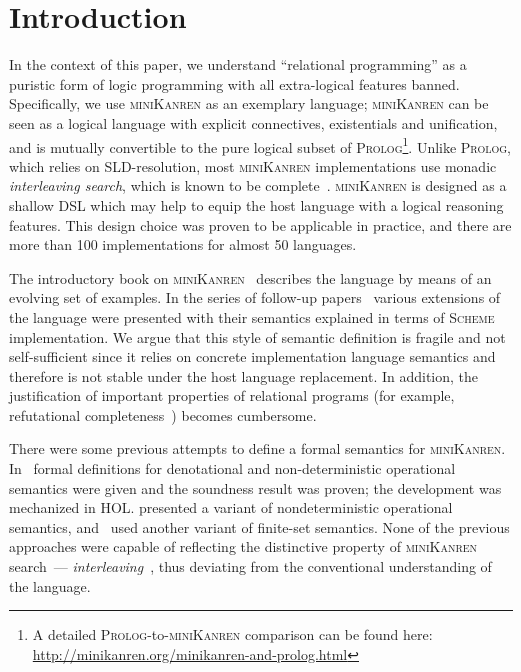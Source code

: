 \section{Introduction}

In the context of this paper, we understand ``relational programming'' as a puristic form of logic programming with all extra-logical
features banned. Specifically, we use \textsc{miniKanren} as an exemplary language; \textsc{miniKanren} can be seen as
a logical language with explicit connectives, existentials and unification, and is mutually convertible to the pure logical subset of
\textsc{Prolog}\footnote{A detailed \textsc{Prolog}-to-\textsc{miniKanren} comparison can be found here: \url{http://minikanren.org/minikanren-and-prolog.html}}.
Unlike \textsc{Prolog}, which relies on SLD-resolution, most \textsc{miniKanren} implementations use monadic \emph{interleaving
search}, which is known to be complete~\cite{2016}.
\textsc{miniKanren} is designed as a shallow DSL which may help to equip the host language with a logical reasoning features. This
design choice was proven to be applicable in practice, and there are more than 100 implementations for almost 50 languages.

The introductory book on \textsc{miniKanren}~\cite{TRS} describes the language by means of an evolving set of examples. In the
series of follow-up papers~\cite{MicroKanren,CKanren,CKanren1,AlphaKanren,2016,Guided} various extensions of the language were presented with
their semantics explained in terms of \textsc{Scheme} implementation. We argue that this style of semantic definition is
fragile and not self-sufficient since it relies on concrete implementation language semantics and therefore is not stable under the host language replacement.
In addition, the justification of important properties of relational programs (for example, refutational completeness~\cite{WillThesis}) becomes cumbersome.

There were some previous attempts to define a formal semantics for \textsc{miniKanren}. In~\cite{MechanisingMiniKanren} formal definitions
for denotational and non-deterministic operational semantics were given and the soundness result was proven; the development was mechanized in HOL. 
\cite{RelConversion} presented a variant of nondeterministic operational semantics, and~\cite{DivTest} used another variant of finite-set semantics.
None of the previous approaches were capable of reflecting the distinctive property of \textsc{miniKanren} search~--- \emph{interleaving}~\cite{Search},
thus deviating from the conventional understanding of the language.

